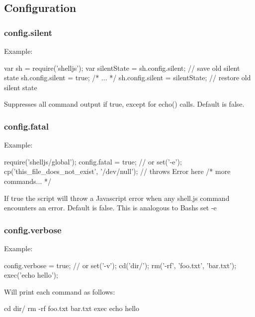 \subsection*{Configuration}

\subsubsection*{config.\+silent}

Example\+:


\begin{DoxyCode}
var sh = require('shelljs');
var silentState = sh.config.silent; // save old silent state
sh.config.silent = true;
/* ... */
sh.config.silent = silentState; // restore old silent state
\end{DoxyCode}


Suppresses all command output if {\ttfamily true}, except for {\ttfamily echo()} calls. Default is {\ttfamily false}.

\subsubsection*{config.\+fatal}

Example\+:


\begin{DoxyCode}
require('shelljs/global');
config.fatal = true; // or set('-e');
cp('this\_file\_does\_not\_exist', '/dev/null'); // throws Error here
/* more commands... */
\end{DoxyCode}


If {\ttfamily true} the script will throw a Javascript error when any shell.\+js command encounters an error. Default is {\ttfamily false}. This is analogous to Bash\textquotesingle{}s {\ttfamily set -\/e}

\subsubsection*{config.\+verbose}

Example\+:


\begin{DoxyCode}
config.verbose = true; // or set('-v');
cd('dir/');
rm('-rf', 'foo.txt', 'bar.txt');
exec('echo hello');
\end{DoxyCode}


Will print each command as follows\+:


\begin{DoxyCode}
cd dir/
rm -rf foo.txt bar.txt
exec echo hello
\end{DoxyCode}



